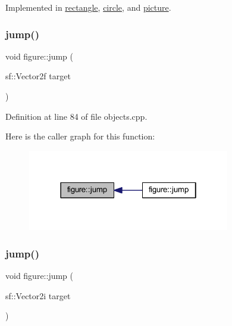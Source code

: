 Implemented in \hyperlink{classrectangle_a827e05afcb275c3e6fe29fc80337d8cc}{rectangle}, \hyperlink{classcircle_a8e0193c47ce75d0aed9b3501dbdd0499}{circle}, and \hyperlink{classpicture_a3a23c2ae495660c218f6f4e40e7e61cc}{picture}.

\mbox{\label{classfigure_a2290acc133127e643fab20c7ce9ab975}} 
\subsubsection{\texorpdfstring{jump()}{jump()}\hspace{0.1cm}{\footnotesize\ttfamily [1/2]}}
{\footnotesize\ttfamily void figure\+::jump (\begin{DoxyParamCaption}\item[{sf\+::\+Vector2f}]{target }\end{DoxyParamCaption})\hspace{0.3cm}{\ttfamily [virtual]}}



Definition at line 84 of file objects.\+cpp.

Here is the caller graph for this function\+:
\nopagebreak
\begin{figure}[H]
\begin{center}
\leavevmode
\includegraphics[width=250pt]{classfigure_a2290acc133127e643fab20c7ce9ab975_icgraph}
\end{center}
\end{figure}
\mbox{\label{classfigure_a25bfb0a452b2b2fe60f7f01b08dab423}} 
\subsubsection{\texorpdfstring{jump()}{jump()}\hspace{0.1cm}{\footnotesize\ttfamily [2/2]}}
{\footnotesize\ttfamily void figure\+::jump (\begin{DoxyParamCaption}\item[{sf\+::\+Vector2i}]{target }\end{DoxyParamCaption})\hspace{0.3cm}{\ttfamily [virtual]}}



